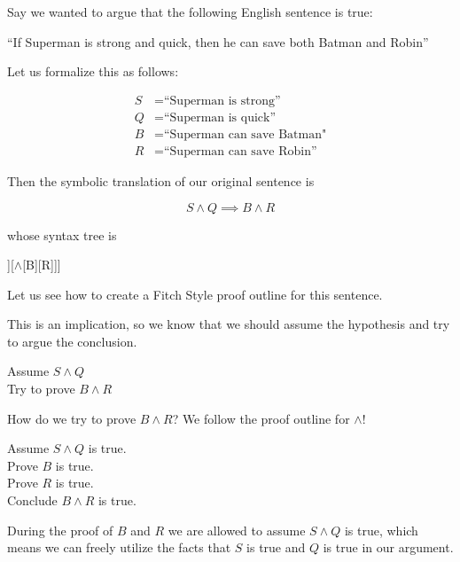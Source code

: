 Say we wanted to argue that the following English sentence is true:

\begin{center}
		``If Superman is strong and quick, then he can save both Batman and Robin''
	\end{center}

Let us formalize this as follows:

\begin{align*}
	S &= \textrm{``Superman is strong''}\\
	Q&= \textrm{``Superman is quick''}\\
	B &= \textrm{``Superman can save Batman"}\\
	R &= \textrm{``Superman can save Robin''}
\end{align*}

Then the symbolic translation of our original sentence is

$$
S \wedge Q \implies B \wedge R
$$

whose syntax tree is

\begin{center}
\begin{forest}
	[$\implies$[$\wedge$[S][Q]][$\wedge$[B][R]]]
	\end{forest}
\end{center}

Let us see how to create a Fitch Style proof outline for this sentence.

This is an implication, so we know that we should assume the hypothesis and try to argue the conclusion.

\begin{fitch*}
	\textrm{Assume $S \wedge Q$}\\
	\fa \textrm{Try to prove $B \wedge R$}
	\end{fitch*}

 

How do we try to prove $B \wedge R$?  We follow the proof outline for $\wedge$!

\begin{fitch*}
	\textrm{Assume $S \wedge Q$ is true.}\\
	\fa \textrm{Prove $B$ is true.}\\
	\fa \textrm{Prove $R$  is true.}\\
	\fa \textrm{Conclude $B \wedge R$ is true.}
\end{fitch*}

During the proof of $B$ and $R$ we are allowed to assume $S \wedge Q$ is true, which means we can freely utilize the facts that $S$ is true and $Q$ is true in our argument.

